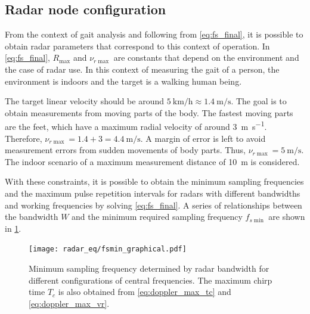 \subsection{Radar node configuration} \label{sec:radar_operating_conditions}

From the context of gait analysis and following from \cref{eq:fs_final}, it is possible to obtain radar parameters that correspond to this context of operation. In \cref{eq:fs_final}, $R_{\max}$ and $\nu_{r\max}$ are constants that depend on the environment and the case of radar use. In this context of measuring the gait of a person, the environment is indoors and the target is a walking human being.

The target linear velocity should be around $\SI{5}{\kilo\meter\per\hour} \approx \SI{1.4}{\meter\per\second}$. The goal is to obtain measurements from moving parts of the body. The fastest moving parts are the feet, which have a maximum radial velocity of around \SI{3}{\meter\per\second}. Therefore, $\nu_{r\max} = 1.4 + 3 = \SI{4.4}{\meter\per\second}$. A margin of error is left to avoid measurement errors from sudden movements of body parts. Thus, $\nu_{r\max} =\SI{5}{\meter\per\second}$. The indoor scenario of a maximum measurement distance of \SI{10}{\metre} is considered.

With these constraints, it is possible to obtain the minimum sampling frequencies and the maximum pulse repetition intervals for radars with different bandwidths and working frequencies by solving \cref{eq:fs_final}. A series of relationships between the bandwidth $W$ and the minimum required sampling frequency $f_{s\min}$ are shown in \cref{fig:fs_W}.

\begin{figure}[htb]
	\centering
	\texttt{[image: radar\_eq/fsmin\_graphical.pdf]}
	\caption{Minimum sampling frequency determined by radar bandwidth for different configurations of central frequencies. The maximum chirp time $T_c$ is also obtained from \cref{eq:doppler_max_tc} and \cref{eq:doppler_max_vr}.}
	\label{fig:fs_W}
\end{figure}



